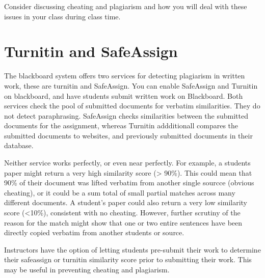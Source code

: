 \documentclass[]{book}
\theoremstyle{definition}
\theoremstyle{definition}
\theoremstyle{definition}
\theoremstyle{remark}
\begin{document}
Consider discussing cheating and plagiarism and how you will deal with
these issues in your class during class time.

\section{Turnitin and SafeAssign}\label{turnitin-and-safeassign}

The blackboard system offers two services for detecting plagiarism in
written work, these are turnitin and SafeAssign. You can enable
SafeAssign and Turnitin on blackboard, and have students submit written
work on Blackboard. Both services check the pool of submitted documents
for verbatim similarities. They do not detect paraphrasing. SafeAssign
checks similarities between the submitted documents for the assignment,
whereas Turnitin addditionall compares the submitted documents to
websites, and previously submitted documents in their database.

Neither service works perfectly, or even near perfectly. For example, a
students paper might return a very high similarity score (\textgreater{}
90\%). This could mean that 90\% of their document was lifted verbatim
from another single sourcce (obvious cheating), or it could be a sum
total of small partial matches across many different documents. A
student's paper could also return a very low similarity score
(\textless{}10\%), consistent with no cheating. However, further
scrutiny of the reason for the match might show that one or two entire
sentences have been directly copied verbatim from another students or
source.

Instructors have the option of letting students pre-submit their work to
determine their safeassign or turnitin similarity score prior to
submitting their work. This may be useful in preventing cheating and
plagiarism.


\end{document}
